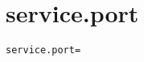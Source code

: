 \section{service.port}
\label{configuration:ServicePort}
\AvailableInCsharpOnly{\TODO}
\begin{lstlisting}[style=Props,caption={Usage example for \textit{service.port}}]
service.port=
\end{lstlisting}